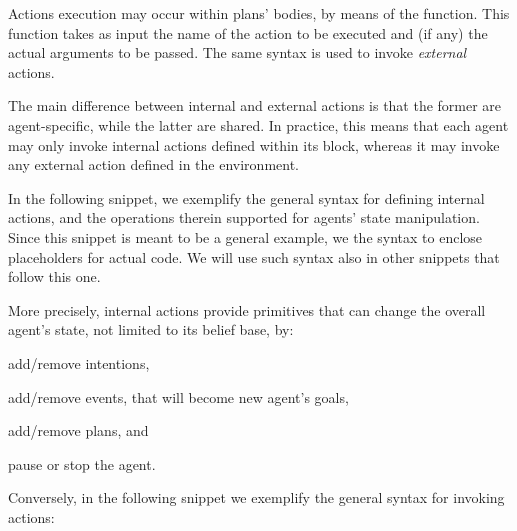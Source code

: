 Actions execution may occur within plans' bodies, by means of the  function.
%
This function takes as input the name of the action to be executed and (if any) the actual arguments to be passed.
%
The same syntax is used to invoke \emph{external} actions.

The main difference between internal and external actions is that
the former are agent-specific,
while the latter are shared.
%
In practice, this means that
each agent may only invoke internal actions defined within its  block,
whereas it may invoke any external action defined in the environment.

In the following snippet, we exemplify the general syntax for defining internal actions,
and the operations therein supported for agents' state manipulation.
%
Since this snippet is meant to be a general example,
we the syntax \meta{} to enclose placeholders for actual code.
%
We will use such syntax also in other snippets that follow this one.
%

%
More precisely,
internal actions provide primitives that can change the overall agent's state, not limited to its belief base, by:
\begin{inlinelist}
    \item add/remove intentions,
    \item add/remove events, that will become new agent's goals,
    \item add/remove plans,
    and
    \item pause or stop the agent.
\end{inlinelist}

Conversely, in the following snippet we exemplify the general syntax for invoking actions:
%


